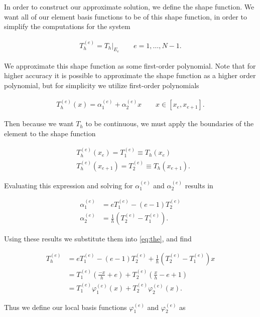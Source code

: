 \documentclass[10pt]{amsart}
\numberwithin{equation}{section}
\theoremstyle{definition}
\begin{document}
\begin{multicols}{2}
  In order to construct our approximate solution, we define the shape function.
  We want all of our element basis functions to be of this shape function,
  in order to simplify the computations for the system

  \begin{align*}
    T_h^{(e)}=T_h\Bigr|_{E_e}\quad\quad e=1,\ldots,N-1.
  \end{align*}

  We approximate this shape function as some first-order polynomial. Note that
  for higher accuracy it is possible to approximate the shape function as a
  higher order polynomial, but for simplicity we utilize first-order
  polynomials

  \begin{align}\label{eq:the}
    T_h^{(e)}(x)=\alpha_1^{(e)}+\alpha_2^{(e)}x\quad\quad
    x\in\left[x_e,x_{e+1}\right].
  \end{align}

  Then because we want $T_h$ to be continuous, we must apply the boundaries
  of the element to the shape function

  \begin{align*}
  &T_h^{(e)}(x_e)=T_1^{(e)}\equiv T_h(x_e)\\
  &T_h^{(e)}(x_{e+1})=T_2^{(e)}\equiv T_h(x_{e+1}).
  \end{align*}

  Evaluating this expression and solving for $\alpha_1^{(e)}$ and
  $\alpha_2^{(e)}$ results in

  \begin{align*}
    \alpha_1^{(e)}&=eT_1^{(e)}-(e-1)T_2^{(e)}\\
    \alpha_2^{(e)}&=\frac{1}{h}\left(T_2^{(e)}-T_1^{(e)}\right).
  \end{align*}

  Using these results we substitute them into \eqref{eq:the}, and find

  \begin{align*}
    T_h^{(e)}&=eT_1^{(e)}-(e-1)T_2^{(e)}+\frac{1}{h}\left(T_2^{(e)}-T_1^{(e)}\right)x\\
             &=T_1^{(e)}\left(\frac{-x}{h}+e\right)+T_2^{(e)}\left(\frac{x}{h}-e+1\right)\\
             &=T_1^{(e)}\varphi_1^{(e)}(x)+T_2^{(e)}\varphi_2^{(e)}(x).
  \end{align*}

  Thus we define our local basis functions $\varphi_1^{(e)}$ and
  $\varphi_2^{(e)}$ as


\end{multicols}
\end{document}

